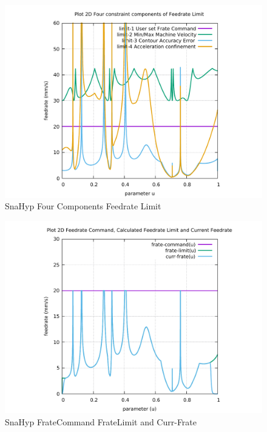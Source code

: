 \begin{figure}
	\caption     {SnaHyp Four Components Feedrate Limit}
	\label{10-img-SnaHyp-Four-Components-Feedrate-Limit.pdf}
\includegraphics[width=1.00\textwidth]{Chap4/appendix/app-SnaHyp/plots/10-img-SnaHyp-Four-Components-Feedrate-Limit.pdf}
\end{figure}

\clearpage
\pagebreak

\begin{figure}
	\caption     {SnaHyp FrateCommand FrateLimit and Curr-Frate}
	\label{11-img-SnaHyp-FrateCommand-FrateLimit-and-Curr-Frate.pdf}
\includegraphics[width=1.00\textwidth]{Chap4/appendix/app-SnaHyp/plots/11-img-SnaHyp-FrateCommand-FrateLimit-and-Curr-Frate.pdf}
\end{figure}


